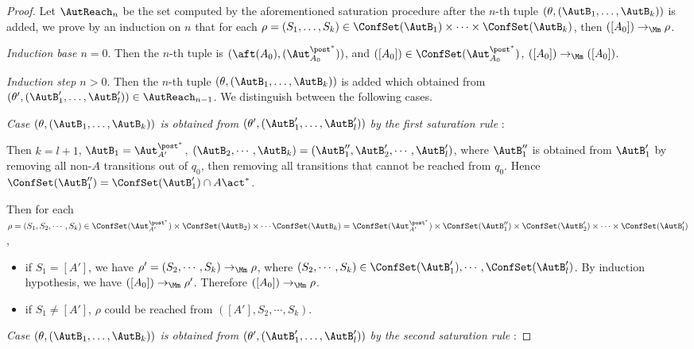 \begin{proof}
    Let $\AutReach_n$ be the set computed by the aforementioned saturation procedure after the $n$-th tuple $(\theta,(\AutB_1,\dots,\AutB_k))$ is added, we prove by an induction on $n$ that for each $\rho = (S_1,\dots,S_k)\in\ConfSet(\AutB_1) \times \dots \times \ConfSet(\AutB_k)$, then $([A_0])\rightarrow_{\Mm}\rho$.

    \noindent \emph{Induction base $n = 0$}. Then the $n$-th tuple is $(\aft(A_0),(\Aut_{A_0}^{\post^*}))$, and $([A_0]) \in \ConfSet(\Aut_{A_0}^{\post^*})$, $([A_0])\rightarrow_{\Mm}([A_0])$.

\smallskip

\noindent \emph{Induction step $n > 0$}. Then the $n$-th tuple $(\theta,(\AutB_1,\dots,\AutB_k))$ is added which obtained from $(\theta',(\AutB_1',\dots,\AutB_l'))\in\AutReach_{n-1}$.
We distinguish between the following cases.

\noindent \emph{Case $(\theta,(\AutB_1,\dots,\AutB_k))$ is obtained from $(\theta',(\AutB_1',\dots,\AutB_l'))$ by the first saturation rule} :

Then $k = l+1$, $\AutB_1 = \Aut_{A'}^{\post^*}$, $(\AutB_2,\cdots,\AutB_k) = (\AutB_1'',\AutB_2',\cdots,\AutB_l')$, 
where $\AutB_1''$ is obtained from $\AutB_1'$ by removing all non-$A$ transitions out of $q_0$, then removing all transitions that cannot be reached from $q_0$. Hence $\ConfSet(\AutB_1'') = \ConfSet(\AutB_1')\cap A\act^*$.

Then for each $\rho=(S_1,S_2,\cdots,S_k)\in\ConfSet(\Aut_{A'}^{\post^*})\times\ConfSet(\AutB_2)\times\cdots\ConfSet(\AutB_k) = \ConfSet(\Aut_{A'}^{\post^*})\times\ConfSet(\AutB_1'')\times\ConfSet(\AutB_2')\times\cdots\times\ConfSet(\AutB_l')$, 
\begin{itemize}
    \item if $S_1=[A']$, we have $\rho' = (S_2,\cdots,S_k)\rightarrow_{\Mm}\rho$, where $(S_2,\cdots,S_k)\in\ConfSet(\AutB_1'),\cdots,\ConfSet(\AutB_l')$.  By induction hypothesis, we have $([A_0])\rightarrow_{\Mm} \rho'$. Therefore $([A_0])\rightarrow_{\Mm}\rho$.
    \item if $S_1\neq[A']$, $\rho$ could be reached from $([A'],S_2,\cdots,S_k)$.
\end{itemize}

\noindent \emph{Case $(\theta,(\AutB_1,\dots,\AutB_k))$ is obtained from $(\theta',(\AutB_1',\dots,\AutB_l'))$ by the second saturation rule} :


\end{proof}
